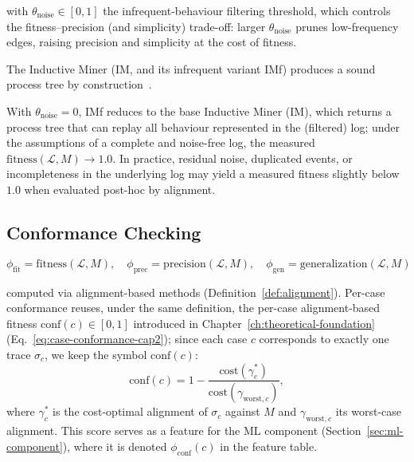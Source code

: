 with $\theta_{\text{noise}} \in [0, 1]$ the infrequent-behaviour filtering
threshold, which controls the fitness--precision (and simplicity)
trade-off: larger $\theta_{\text{noise}}$ prunes low-frequency edges,
raising precision and simplicity at the cost of fitness.

\begin{property}
\label{prop:soundness}
The Inductive Miner (IM, and its infrequent variant IMf) produces a sound
process tree by construction~\cite{leemans2013discovering}.
\end{property}

\begin{property}
\label{prop:fitness}
With $\theta_{\text{noise}} = 0$, IMf reduces to the base Inductive Miner
(IM), which returns a process tree
that can replay all behaviour represented in the (filtered) log; under the
assumptions of a complete and noise-free log, the measured
$\text{fitness}(\mathcal{L}, M) \to 1.0$. In practice, residual noise,
duplicated events, or incompleteness in the underlying log may yield a
measured fitness slightly below $1.0$ when evaluated post-hoc by alignment.
\end{property}


\subsection{Conformance Checking}
\label{sec:s2-conformance}

\begin{equation}
\label{eq:conformance}
\phi_{\text{fit}} = \text{fitness}(\mathcal{L}, M), \quad
\phi_{\text{prec}} = \text{precision}(\mathcal{L}, M), \quad
\phi_{\text{gen}} = \text{generalization}(\mathcal{L}, M)
\end{equation}

computed via alignment-based methods (Definition~\ref{def:alignment}).
Per-case conformance reuses, under the same definition, the per-case
alignment-based fitness $\text{conf}(c) \in [0,1]$ introduced in
Chapter~\ref{ch:theoretical-foundation}
(Eq.~\ref{eq:case-conformance-cap2}); since each case $c$ corresponds to
exactly one trace $\sigma_c$, we keep the symbol $\text{conf}(c)$:
\begin{equation}
\label{eq:case-conformance}
\text{conf}(c) = 1 - \frac{\text{cost}(\gamma^*_c)}
    {\text{cost}(\gamma_{\text{worst},c})} ,
\end{equation}
where $\gamma^*_c$ is the cost-optimal alignment of $\sigma_c$ against $M$ and
$\gamma_{\text{worst},c}$ its worst-case alignment. This score serves as a
feature for the ML component (Section~\ref{sec:ml-component}), where it is
denoted $\phi_{\text{conf}}(c)$ in the feature table.


